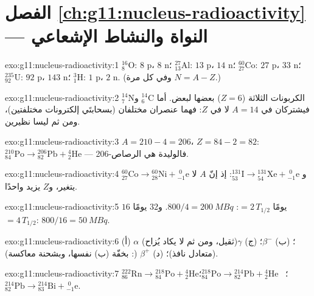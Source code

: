 \section*{الفصل \ref{ch:g11:nucleus-radioactivity} --- النواة والنشاط الإشعاعي}

\begin{solution}{exo:g11:nucleus-radioactivity:1}
${}^{16}_{8}\mathrm{O}$: $8$ p، $8$ n؛ ${}^{27}_{13}\mathrm{Al}$: $13$ p،
$14$ n؛ ${}^{60}_{27}\mathrm{Co}$: $27$ p، $33$ n؛
${}^{235}_{92}\mathrm{U}$: $92$ p، $143$ n؛ ${}^{3}_{1}\mathrm{H}$: $1$ p،
$2$ n. (وفي كل مرة $N = A - Z$.)
\end{solution}

\begin{solution}{exo:g11:nucleus-radioactivity:2}
الكربونات الثلاثة ($Z = 6$)  بعضها لبعض.
أما ${}^{14}_{6}\mathrm{C}$ و${}^{14}_{7}\mathrm{N}$ فيشتركان في $A = 14$ لا في
$Z$: فهما عنصران مختلفان (بسحابتَي إلكترونات مختلفتين)، ومن ثم ليسا نظيرين.
\end{solution}

\begin{solution}{exo:g11:nucleus-radioactivity:3}
$A = 210 - 4 = 206$، $Z = 84 - 2 = 82$:
${}^{210}_{84}\mathrm{Po} \to {}^{206}_{82}\mathrm{Pb} +
{}^{4}_{2}\mathrm{He}$ --- فالوليدة هي الرصاص-206.
\end{solution}

\begin{solution}{exo:g11:nucleus-radioactivity:4}
${}^{60}_{27}\mathrm{Co} \to {}^{60}_{28}\mathrm{Ni} +
{}^{\;0}_{-1}\mathrm{e}$ و
${}^{131}_{53}\mathrm{I} \to {}^{131}_{54}\mathrm{Xe} +
{}^{\;0}_{-1}\mathrm{e}$: إذ إنّ $A$ لا يتغير، و$Z$ يزيد واحدًا.
\end{solution}

\begin{solution}{exo:g11:nucleus-radioactivity:5}
$16$ يومًا $= 2\,T_{1/2}$: $800/4 = \qty{200}{MBq}$. و$32$ يومًا
$= 4\,T_{1/2}$: $800/16 = \qty{50}{MBq}$.
\end{solution}

\begin{solution}{exo:g11:nucleus-radioactivity:6}
(أ) $\alpha$ (ثقيل، ومن ثم لا يكاد يُزاح)؛ (ب) $\beta^-$؛ (ج) $\gamma$
(متعادل نافذ)؛ (د) $\beta^+$ (: بخفّة (ب) نفسها، وبشحنة
معاكسة).
\end{solution}

\begin{solution}{exo:g11:nucleus-radioactivity:7}
${}^{222}_{86}\mathrm{Rn} \to {}^{218}_{84}\mathrm{Po} +
{}^{4}_{2}\mathrm{He}$؛ \
${}^{218}_{84}\mathrm{Po} \to {}^{214}_{82}\mathrm{Pb} +
{}^{4}_{2}\mathrm{He}$؛ \
${}^{214}_{82}\mathrm{Pb} \to {}^{214}_{83}\mathrm{Bi} +
{}^{\;0}_{-1}\mathrm{e}$.
\end{solution}

